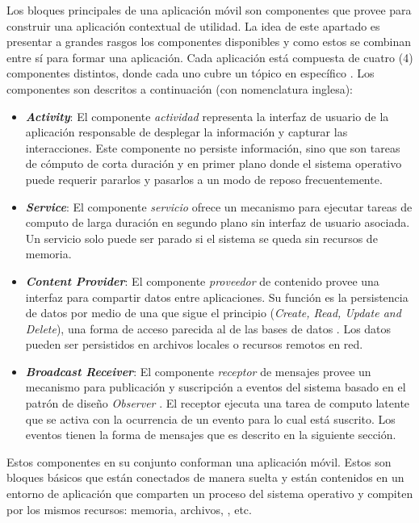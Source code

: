 Los bloques principales de una aplicación móvil son componentes que
\emph{} provee para construir una aplicación contextual
de utilidad. La idea de este apartado es presentar a grandes rasgos
los componentes disponibles y como estos se combinan entre sí para
formar una aplicación. Cada aplicación está compuesta de cuatro (4)
componentes distintos, donde cada uno cubre un tópico en específico
\cite{Gargenta2014}. Los componentes son descritos a continuación
(con nomenclatura inglesa):
\begin{itemize}
\item \textbf{\emph{Activity}}: El componente \emph{actividad} representa
la interfaz de usuario de la aplicación responsable de desplegar la
información y capturar las interacciones. Este componente no persiste
información, sino que son tareas de cómputo de corta duración y en
primer plano donde el sistema operativo puede requerir pararlos y
pasarlos a un modo de reposo frecuentemente.
\item \textbf{\emph{Service}}: El componente \emph{servicio} ofrece un mecanismo
para ejecutar tareas de computo de larga duración en segundo plano
sin interfaz de usuario asociada. Un servicio solo puede ser parado
si el sistema se queda sin recursos de memoria.
\item \textbf{\emph{Content Provider}}: El componente \emph{proveedor} de
contenido provee una interfaz para compartir datos entre aplicaciones.
Su función es la persistencia de datos por medio de una 
que sigue el principio  (\emph{Create, Read, Update and
Delete}), una forma de acceso parecida al de las bases de datos .
Los datos pueden ser persistidos en archivos locales o recursos remotos
en red.
\item \textbf{\emph{Broadcast Receiver}}: El componente \emph{receptor}
de mensajes provee un mecanismo para publicación y suscripción a eventos
del sistema basado en el patrón de diseño \emph{Observer} \cite{Shalloway2004}.
El receptor ejecuta una tarea de computo latente que se activa con
la ocurrencia de un evento para lo cual está suscrito. Los eventos
tienen la forma de mensajes que es descrito en la siguiente sección.
\end{itemize}
Estos componentes en su conjunto conforman una aplicación móvil. Estos
son bloques básicos que están conectados de manera suelta y están
contenidos en un entorno de aplicación que comparten un proceso del
sistema operativo y compiten por los mismos recursos: memoria, archivos,
, etc.

